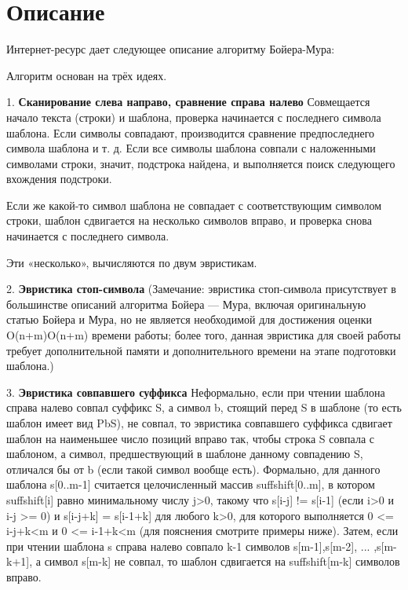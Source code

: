 \section{Описание}

Интернет-ресурс \cite{wikipedia_BM} дает следующее описание алгоритму Бойера-Мура:\newline

Алгоритм основан на трёх идеях.

1. \textbf{Сканирование слева направо, сравнение справа налево}\newline
Совмещается начало текста (строки) и шаблона, проверка начинается с последнего символа шаблона. Если символы совпадают, производится сравнение предпоследнего символа шаблона и т. д. Если все символы шаблона совпали с наложенными символами строки, значит, подстрока найдена, и выполняется поиск следующего вхождения подстроки.\newline

Если же какой-то символ шаблона не совпадает с соответствующим символом строки, шаблон сдвигается на несколько символов вправо, и проверка снова начинается с последнего символа.\newline

Эти «несколько», вычисляются по двум эвристикам.\newline

2. \textbf{Эвристика стоп-символа}\newline
(Замечание: эвристика стоп-символа присутствует в большинстве описаний алгоритма Бойера — Мура, включая оригинальную статью Бойера и Мура, но не является необходимой для достижения оценки {\displaystyle O(n+m)}{\displaystyle O(n+m)} времени работы; более того, данная эвристика для своей работы требует дополнительной памяти и дополнительного времени на этапе подготовки шаблона.)\newline

3. \textbf{Эвристика совпавшего суффикса}\newline
Неформально, если при чтении шаблона справа налево совпал суффикс S, а символ b, стоящий перед S в шаблоне (то есть шаблон имеет вид PbS), не совпал, то эвристика совпавшего суффикса сдвигает шаблон на наименьшее число позиций вправо так, чтобы строка S совпала с шаблоном, а символ, предшествующий в шаблоне данному совпадению S, отличался бы от b (если такой символ вообще есть). Формально, для данного шаблона s[0..m{-}1] считается целочисленный массив suffshift[0..m], в котором suffshift[i] равно минимальному числу j>0, такому что s[i{-}j] != s[i{-}1] (если i>0 и i-j >= 0) и s[i{-}j{+}k] = s[i{-}1{+}k] для любого k>0, для которого выполняется 0 <= i-j+k<m и 0 <= i-1+k<m (для пояснения смотрите примеры ниже). Затем, если при чтении шаблона s справа налево совпало k{-}1 символов s[m{-}1],s[m{-}2], ... ,s[m{-}k{+}1], а символ s[m{-}k] не совпал, то шаблон сдвигается на suffshift[m-k] символов вправо. 


